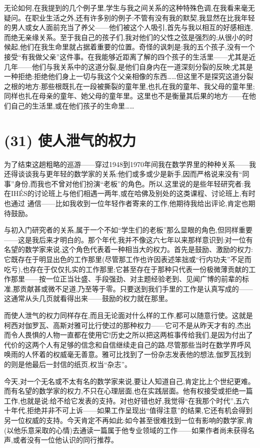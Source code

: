 无论如何,在我提到的几个例子里,学生与我之间关系的这种特殊色调,在我看来毫无疑问。在职业生活之外,还有许多别的例子:不管有没有我的默契,我显然在比我年轻的男人或女人面前充当了养父——他们被这个人吸引,首先与我以相互的好感相连,而绝无亲缘关系。至于我自己的孩子们,我对他们的父性之弦是强烈的;从很小的时候起,他们在我生命里就占据着重要的位置。奇怪的讽刺是:我的五个孩子,没有一个接受“有我做父亲”这件事。在我能够近距离了解的四个孩子的生活里——尤其是近几年——他们与我关系中的这道分裂,是他们自身内在一道深刻分裂的反映;尤其是一种拒绝:拒绝他们身上一切与我这个父亲相像的东西……但这里不是探究这道分裂之根的地方:那些根既扎在一段被撕裂的童年里,也扎在我的童年、我父母的童年里;同样也扎在母亲的童年、她父母的童年里。这里也不是衡量其后果的地方——在他们自己的生活里,或在他们孩子的生命里……

\section{(31) 使人泄气的权力}

为了结束这趟粗略的巡游——穿过1948到1970年间我在数学界里的种种关系——我还得谈谈我与更年轻的数学家的关系:他们或多或少是新手,因而严格说来没有“同事”身份,而我也不曾对他们扮演“老板”的角色。所以,这里说的是些年轻研究者:我在IHÉS的讨论班上与他们相遇一两年,或在哈佛及别处的这类课程、讨论班上,有时也通过
%
 通信——比如我收到一位年轻作者寄来的工作,他期待我给出评论,肯定也期待鼓励。

与初入门研究者的关系,属于一个不如“学生们的老板”那么显眼的角色,但同样重要——这是我后来才明白的。那个年代,我并不像这六七年以来那样意识到:对一位有名望的数学家来说,这个角色代表着一种相当大的权力。首先是鼓励、激励的权力:它既存在于明显出色的工作那里(尽管那工作也许因表述笨拙或“行内功夫”不足而吃亏),也存在于仅仅扎实的工作那里;它甚至存在于那种只代表一份极微薄贡献的工作那里——按一位正当壮盛、手段强劲、对主题经验老到、见闻广博的前辈的标准,那贡献甚或微不足道,乃至等于零。只要送到我们手里的工作是认真写成的——这通常从头几页就看得出来——鼓励的权力就在那里。

而使人泄气的权力同样存在,而且无论面对什么样的工作,都可以随意行使。这就是柯西对伽罗瓦、高斯对雅可比行使过的那种权力——它可不是从昨天才有的,杰出而令人畏惧的人物一直都在使用它!历史之所以把这两桩事传给我们,是因为付出了代价的这两个人有足够的信念和自信继续走自己的路,尽管那些当时在数学界呼风唤雨的人怀着的权威毫无善意。雅可比找到了一份杂志发表他的想法,伽罗瓦找到的则是他最后一封信的纸页,权当“杂志”。

今天,对一个无名或不太有名的数学家来说,要让人知道自己,肯定比上个世纪更难。而有名望的数学家的权力,不只在心理层面,也在实践层面。他有权接受或拒绝一篇工作,也就是说:给不给它发表的支持。对也好错也好,我觉得“在我那个时代”,五六十年代,拒绝并非不可上诉——如果工作呈现出“值得注意”的结果,它还有机会得到另一位权威的支持。今天肯定不再如此:如今甚至很难找到一位有影响的数学家,肯(以他乐意采取的心情)去通读一篇属于他专业领域的工作——如果作者尚未获得名声,或者没有一位他认识的同行推荐。


